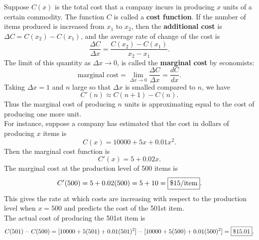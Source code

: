 \documentclass{book}
\begin{document}
\begin{Exam}\label{exam:costfunction} Suppose $C(x)$ is the total cost that a company incurs in producing $x$ units of a certain commodity. The function $C$ is called a \textbf{cost function}. If the number of items produced is increased from $x_1$ to $x_2$, then the \textbf{additional cost} is $\Delta C = C(x_2)-C(x_1)$, and the average rate of change of the cost is \[\dfrac{\Delta C}{\Delta x} = \dfrac{C(x_2)-C(x_1)}{x_2-x_1}.\] The limit of this quantity as $\Delta x \to 0$, is called the \textbf{marginal cost} by economists: 
\[\text{marginal cost} = \lim_{\Delta x \to 0} \dfrac{\Delta C}{\Delta x} = \dfrac{dC}{dx}.\] Taking $\Delta x = 1$ and $n$ large so that $\Delta x$ is smalled compared to $n$, we have \[C'(n) \approx C(n+1)-C(n).\] Thus the marginal cost of producing $n$ units is approximating equal to the cost of producing one more unit.\\

 For instance, suppose a company has estimated that the cost in dollars of producing $x$ items is \[C(x) = 10000+5x+0.01x^2.\] Then the marginal cost function is \[C'(x) = 5+0.02x.\] The marginal cost at the production level of 500 items is \[C'(500) = 5 + 0.02(500) = 5 + 10 = \fbox{\$15/\text{item}}.\] This gives the rate at which costs are increasing with respect to the production level when $x=500$ and predicts the cost of the 501st item.\\ 

The actual cost of producing the 501st item is \[C(501) - C(500) = [10000 + 5(501) + 0.01(501)^2] - [10000 + 5(500) + 0.01(500)^2] = \fbox{\$15.01}. \]
\end{Exam}\vs

%
%
%
\end{document}
